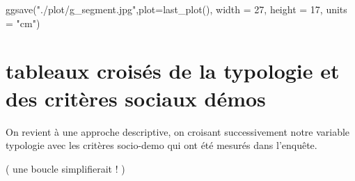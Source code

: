\documentclass[
]{book}
\newenvironment{Shaded}{\begin{snugshade}}{\end{snugshade}}
\newcommand{\AttributeTok}[1]{\textcolor[rgb]{0.77,0.63,0.00}{#1}}
\newcommand{\DecValTok}[1]{\textcolor[rgb]{0.00,0.00,0.81}{#1}}
\newcommand{\FunctionTok}[1]{\textcolor[rgb]{0.00,0.00,0.00}{#1}}
\newcommand{\NormalTok}[1]{#1}
\newcommand{\StringTok}[1]{\textcolor[rgb]{0.31,0.60,0.02}{#1}}
\begin{document}
\begin{Shaded}
\begin{Highlighting}[]
\FunctionTok{ggsave}\NormalTok{(}\StringTok{"./plot/g\_segment.jpg"}\NormalTok{,}\AttributeTok{plot=}\FunctionTok{last\_plot}\NormalTok{(), }\AttributeTok{width =} \DecValTok{27}\NormalTok{, }\AttributeTok{height =} \DecValTok{17}\NormalTok{, }\AttributeTok{units =} \StringTok{"cm"}\NormalTok{)}
\end{Highlighting}
\end{Shaded}

\hypertarget{tableaux-croisuxe9s-de-la-typologie-et-des-crituxe8res-sociaux-duxe9mos}{%
\section{tableaux croisés de la typologie et des critères sociaux démos}\label{tableaux-croisuxe9s-de-la-typologie-et-des-crituxe8res-sociaux-duxe9mos}}

On revient à une approche descriptive, on croisant successivement notre variable typologie avec les critères socio-demo qui ont été mesurés dans l'enquête.

( une boucle simplifierait ! )
\end{document}
